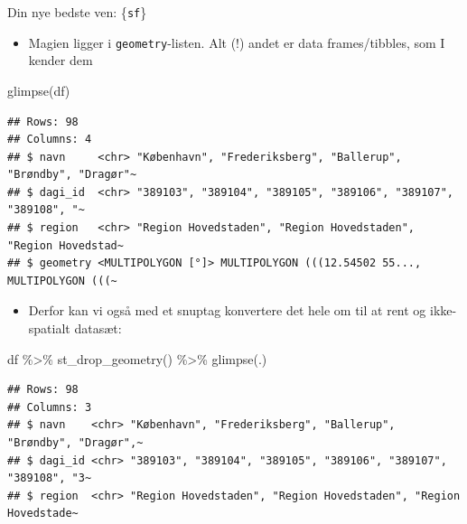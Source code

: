 \documentclass[
  8pt,
  ignorenonframetext,
  aspectratio=169]{beamer}
\newenvironment{Shaded}{}{}
\newcommand{\FunctionTok}[1]{\textcolor[rgb]{0.02,0.16,0.49}{#1}}
\newcommand{\NormalTok}[1]{#1}
\newcommand{\SpecialCharTok}[1]{\textcolor[rgb]{0.25,0.44,0.63}{#1}}
\providecommand{\tightlist}{%
  \setlength{\itemsep}{0pt}\setlength{\parskip}{0pt}}
\begin{document}
\begin{frame}[fragile]{Din nye bedste ven: \{\texttt{sf}\}}
\protect\hypertarget{din-nye-bedste-ven-sf-1}{}
\begin{itemize}
\tightlist
\item
  Magien ligger i \texttt{geometry}-listen. Alt (!) andet er data
  frames/tibbles, som I kender dem
\end{itemize}

\tiny

\begin{Shaded}
\begin{Highlighting}[]
\FunctionTok{glimpse}\NormalTok{(df)}
\end{Highlighting}
\end{Shaded}

\begin{verbatim}
## Rows: 98
## Columns: 4
## $ navn     <chr> "København", "Frederiksberg", "Ballerup", "Brøndby", "Dragør"~
## $ dagi_id  <chr> "389103", "389104", "389105", "389106", "389107", "389108", "~
## $ region   <chr> "Region Hovedstaden", "Region Hovedstaden", "Region Hovedstad~
## $ geometry <MULTIPOLYGON [°]> MULTIPOLYGON (((12.54502 55..., MULTIPOLYGON (((~
\end{verbatim}

\normalsize

\begin{itemize}
\tightlist
\item
  Derfor kan vi også med et snuptag konvertere det hele om til at rent
  og ikke-spatialt datasæt:
\end{itemize}

\tiny

\begin{Shaded}
\begin{Highlighting}[]
\NormalTok{df }\SpecialCharTok{\%\textgreater{}\%} 
  \FunctionTok{st\_drop\_geometry}\NormalTok{() }\SpecialCharTok{\%\textgreater{}\%} 
  \FunctionTok{glimpse}\NormalTok{(.)}
\end{Highlighting}
\end{Shaded}

\begin{verbatim}
## Rows: 98
## Columns: 3
## $ navn    <chr> "København", "Frederiksberg", "Ballerup", "Brøndby", "Dragør",~
## $ dagi_id <chr> "389103", "389104", "389105", "389106", "389107", "389108", "3~
## $ region  <chr> "Region Hovedstaden", "Region Hovedstaden", "Region Hovedstade~
\end{verbatim}

\normalsize
\end{frame}
\end{document}
